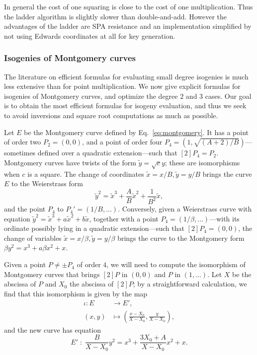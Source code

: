 \documentclass[jmc]{degruyter-journal-a}
\theoremstyle{definition}
\begin{document}
In general the cost of one squaring is close to the cost of one
multiplication. Thus the ladder algorithm is slightly slower than
double-and-add. However the advantages of the ladder are SPA
resistance and an implementation simplified by not using Edwards
coordinates at all for key generation.

\subsubsection{Isogenies of Montgomery curves}\label{sssec:montgomery-isogeny}

The literature on efficient formulas for evaluating small degree
isogenies is much less extensive than for point multiplication. We now
give explicit formulas for isogenies of Montgomery curves, and
optimize the degree $2$ and $3$ cases. Our goal is to obtain the most
efficient formulas for isogeny evaluation, and thus we seek to avoid
inversions and square root computations as much as possible.

Let $E$ be the Montgomery curve defined by Eq.~\eqref{eq:montgomery}.
It has a point of order two $P_2=(0,0)$, and a point of order four
$P_4=(1,\sqrt{(A+2)/B})$---sometimes defined over a quadratic
extension---such that $[2]P_4=P_2$. Montgomery curves have twists of
the form $\tilde{y}=\sqrt{c}y$; these are isomorphisms when $c$ is a
square. The change of coordinates $\tilde{x}=x/B, \tilde{y}=y/B$
brings the curve $E$ to the Weierstrass form
\begin{equation}
  \label{eq:twisted}
  \tilde{y}^2 = \tilde{x}^3 + \frac{A}{B}\tilde{x}^2 + \frac{1}{B^2}\tilde{x},
\end{equation}
and the point $P_4$ to $P_4'=(1/B,\ldots)$. Conversely, given a
Weierstrass curve with equation
$\tilde{y}^2=\tilde{x}^3+a\tilde{x}^2+b\tilde{x}$, together with a
point $P_4=(1/\beta,\ldots)$---with its ordinate possibly lying in a
quadratic extension---such that $[2]P_4=(0,0)$, the change of
variables $\tilde{x}=x/\beta, \tilde{y}=y/\beta$ brings the curve to
the Montgomery form $\beta y^2=x^3+a\beta x^2 + x$.

Given a point $P\ne\pm P_4$ of order $4$, we will need to compute the
isomorphism of Montgomery curves that brings $[2]P$ in $(0,0)$ and $P$
in $(1,\ldots)$. Let $X$ be the abscissa of $P$ and $X_0$ the abscissa
of $[2]P$; by a straightforward calculation, we find that this
isomorphism is given by the map
\begin{equation}
  \label{eq:isomorphism}
  \begin{aligned}
    \iota : E &\to E',\\
    (x,y) &\mapsto \left(\frac{x-X_0}{X-X_0}, \frac{y}{X-X_0}\right),
  \end{aligned}
\end{equation}
and the new curve has equation
\begin{equation*}
  E' \;:\; \frac{B}{X-X_0}y^2 = x^3 + \frac{3X_0 + A}{X-X_0} x^2 + x.
\end{equation*}
\end{document}
